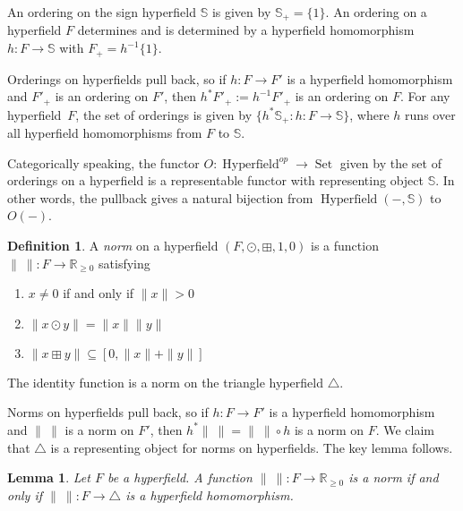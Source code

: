 \documentclass[10pt, preprint]{article}
\newtheorem{lemma}[theorem]{Lemma}
\theoremstyle{definition}
\newtheorem{definition}[theorem]{Definition}
\begin{document}
An ordering on the sign hyperfield $\mathbb{S}$ is given by
$\mathbb{S}_{+} = \{1\}$. An ordering on a hyperfield $F$ determines and
is determined by a hyperfield homomorphism $h : F \to \mathbb{S}$ with
$F_{+} = h^{-1}\{1\}$.

Orderings on hyperfields pull back, so if $h : F \to F'$ is a hyperfield
homomorphism and $F'_{+}$ is an ordering on $F'$, then $h^{*}F'_{+} :=
h^{-1}F'_{+}$ is an ordering on $F$. For any hyperfield~$F$, the set of
orderings  is given by $\{ h^{*}\mathbb{S}
_{+} : h : F \to \mathbb{S}\}$, where $h$ runs over all hyperfield
homomorphisms from $F$ to $\mathbb{S}$.

Categorically speaking, the functor $O : \operatorname{Hyperfield}
^{op} \to \operatorname{Set}$ given by the set of orderings on a
hyperfield is a representable functor with representing object
$\mathbb{S}$. In other words, the pullback gives a natural bijection
from $\operatorname{Hyperfield}(-,\mathbb{S})$ to $O(-)$.

\begin{definition}
A \emph{norm} on a hyperfield $(F, \odot , \boxplus , 1, 0)$ is a
function $\|~\| : F \to \mathbb{R}_{\geq 0}$ satisfying
%
\begin{enumerate}%
\item
$x \neq 0$ if and only if $\|x\|>0$
%
\item
$\|x \odot y\| = \|x\|\|y\|$
%
\item
$\|x \boxplus y\| \subseteq [0, \|x\| + \|y\|]$
\end{enumerate}
%
\end{definition}

The identity function is a norm on the triangle hyperfield $\triangle
$.

Norms on hyperfields pull back, so if $h : F \to F'$ is a hyperfield
homomorphism and $\|~\|$ is a norm on $F'$, then $h^{*}\|~\| = \|~\|
\circ h$ is a norm on $F$. We claim that $\triangle $ is a representing
object for norms on hyperfields. The key lemma follows.\vspace*{-2pt}

\begin{lemma}
Let $F$ be a hyperfield. A function $\|~\| : F \to \mathbb{R}_{\geq 0}$
is a norm if and only if $\|~\|: F \to \triangle $ is a hyperfield
homomorphism.\vspace*{-2pt}
\end{lemma}
\end{document}
